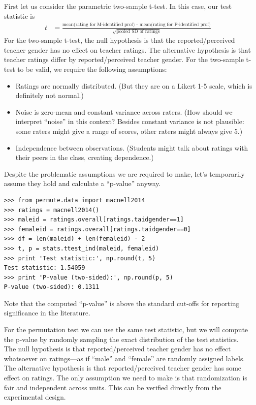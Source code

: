 First let us consider the parametric two-sample t-test.  In this case, our
test statistic is
\begin{align*}
t &= \frac{\text{mean(rating for M-identified prof) - mean(rating for F-identified prof)}}{\sqrt{\text{pooled SD of ratings}}}
\end{align*}
For the two-sample t-test, the null hypothesis is that the reported/perceived
teacher gender has no effect on teacher ratings.  The alternative hypothesis
is that teacher ratings differ by reported/perceived teacher gender.  For the
two-sample t-test to be valid, we require the following assumptions:
\begin{itemize}
\item Ratings are normally distributed.  (But they are on a Likert 1-5 scale,
      which is definitely not normal.)
\item Noise is zero-mean and constant variance across raters.  (How should we interpret
      ``noise'' in this context?  Besides constant variance is not plausible: some
      raters might give a range of scores, other raters might always give 5.)
\item Independence between observations. (Students might talk about ratings with
      their peers in the class, creating dependence.)
\end{itemize}

Despite the problematic assumptions we are required to make, let's temporarily
assume they hold and calculate a ``p-value'' anyway.

\begin{verbatim}
>>> from permute.data import macnell2014
>>> ratings = macnell2014()
>>> maleid = ratings.overall[ratings.taidgender==1]
>>> femaleid = ratings.overall[ratings.taidgender==0]
>>> df = len(maleid) + len(femaleid) - 2
>>> t, p = stats.ttest_ind(maleid, femaleid)
>>> print 'Test statistic:', np.round(t, 5)
Test statistic: 1.54059
>>> print 'P-value (two-sided):', np.round(p, 5)
P-value (two-sided): 0.1311
\end{verbatim}
Note that the computed ``p-value'' is above the standard cut-offs for
reporting significance in the literature.

For the permutation test we can use the same test statistic, but we will
compute the p-value by randomly sampling the exact distribution of the test
statistics.  The null hypothesis is that reported/perceived teacher gender has
no effect whatsoever on ratings---as if ``male'' and ``female'' are randomly
assigned labels.  The alternative hypothesis is that reported/perceived teacher
gender has some effect on ratings.  The only assumption we need to make is that
randomization is fair and independent across units.  This can be verified
directly from the experimental design.

